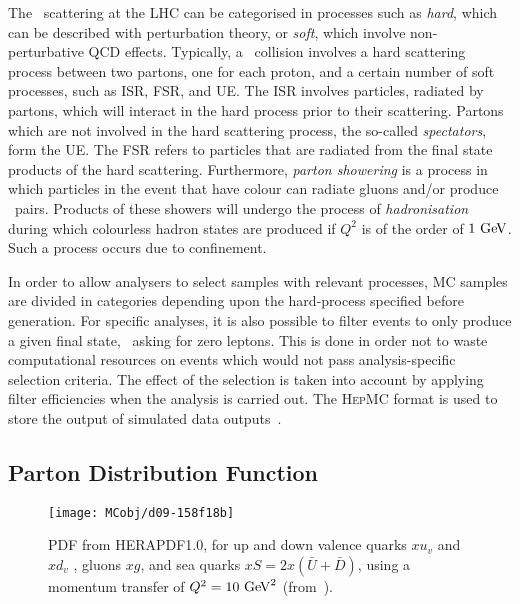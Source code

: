 		The \pp\ scattering at the \ac{LHC} can be categorised in processes such as \emph{hard}, which can be described with perturbation theory, or \emph{soft}, which involve non-perturbative \ac{QCD} effects. Typically, a \pp\ collision involves a hard scattering process between two partons, one for each proton, and a certain number of soft processes, such as \ac{ISR}, \ac{FSR}, and \ac{UE}. The \ac{ISR} involves particles, radiated by partons, which will interact in the hard process prior to their scattering. Partons which are not involved in the hard scattering process, the so-called \emph{spectators}, form the \ac{UE}. The \ac{FSR} refers to particles that are radiated from the final state products of the hard scattering. Furthermore, \emph{parton showering} is a process in which particles in the event that have colour can radiate gluons and/or produce \qqbar\ pairs. Products of these showers will undergo the process of \emph{hadronisation} during which colourless hadron states are produced if $Q^2$ is of the order of $1 \GeV$. Such a process occurs due to confinement. 

		In order to allow analysers to select samples with relevant processes, \ac{MC} samples are divided in categories depending upon the hard-process specified before generation. For specific analyses, it is also possible to filter events to only produce a given final state, \eg\ asking for zero leptons. This is done in order not to waste computational resources on events which would not pass analysis-specific selection criteria. The effect of the selection is taken into account by applying filter efficiencies when the analysis is carried out. The \textsc{HepMC} format is used to store the output of simulated data outputs~\cite{DOBBS200141}.
		

		\subsection*{Parton Distribution Function}

			\begin{wrapfigure}{R}{.5\textwidth}
				\centering
				\texttt{[image: MCobj/d09-158f18b]}
				\caption{\label{fig:HERAPDF} PDF from \textsc{HERAPDF1.0}, for up and down valence quarks $xu_v$ and $xd_v$ , gluons $xg$, and sea quarks $xS = 2x(\bar{U} + \bar{D})$, using a momentum transfer of $Q^2 =10 \GeV^2$ (from~\cite{Aaron:2009aa}).}
			\end{wrapfigure}

